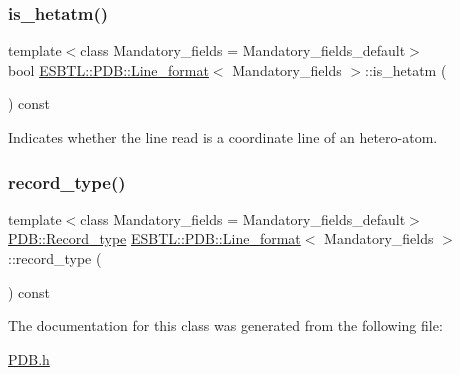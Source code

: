 \mbox{\label{classESBTL_1_1PDB_1_1Line__format_a5985e9f450070463af32eb5438e6f002}} 
\subsubsection{\texorpdfstring{is\+\_\+hetatm()}{is\_hetatm()}}
{\footnotesize\ttfamily template$<$class Mandatory\+\_\+fields  = Mandatory\+\_\+fields\+\_\+default$>$ \\
bool \hyperlink{classESBTL_1_1PDB_1_1Line__format}{E\+S\+B\+T\+L\+::\+P\+D\+B\+::\+Line\+\_\+format}$<$ Mandatory\+\_\+fields $>$\+::is\+\_\+hetatm (\begin{DoxyParamCaption}{ }\end{DoxyParamCaption}) const\hspace{0.3cm}{\ttfamily [inline]}}

Indicates whether the line read is a coordinate line of an hetero-\/atom. \mbox{\label{classESBTL_1_1PDB_1_1Line__format_ae266a9259dbd80a17d82e0dd42852fa3}} 
\subsubsection{\texorpdfstring{record\+\_\+type()}{record\_type()}}
{\footnotesize\ttfamily template$<$class Mandatory\+\_\+fields  = Mandatory\+\_\+fields\+\_\+default$>$ \\
\hyperlink{namespaceESBTL_1_1PDB_a6f11e88f706f51afbe97230641a469b7}{P\+D\+B\+::\+Record\+\_\+type} \hyperlink{classESBTL_1_1PDB_1_1Line__format}{E\+S\+B\+T\+L\+::\+P\+D\+B\+::\+Line\+\_\+format}$<$ Mandatory\+\_\+fields $>$\+::record\+\_\+type (\begin{DoxyParamCaption}{ }\end{DoxyParamCaption}) const\hspace{0.3cm}{\ttfamily [inline]}}



The documentation for this class was generated from the following file\+:\begin{DoxyCompactItemize}
\item 
\hyperlink{PDB_8h}{P\+D\+B.\+h}\end{DoxyCompactItemize}
